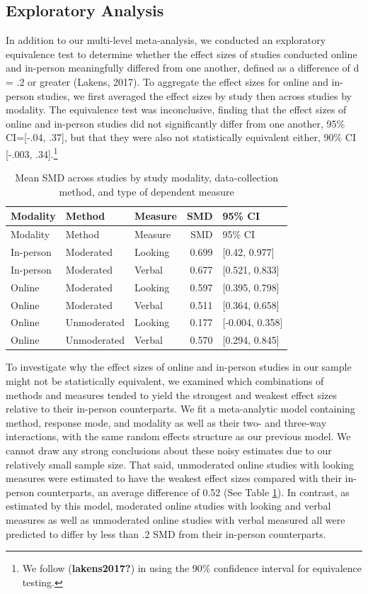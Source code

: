 \documentclass[
  man,floatsintext]{apa6}
\begin{document}
\hypertarget{exploratory-analysis}{%
\subsection{Exploratory Analysis}\label{exploratory-analysis}}

In addition to our multi-level meta-analysis, we conducted an exploratory equivalence test to determine whether the effect sizes of studies conducted online and in-person meaningfully differed from one another, defined as a difference of d = .2 or greater (Lakens, 2017). To aggregate the effect sizes for online and in-person studies, we first averaged the effect sizes by study then across studies by modality. The equivalence test was inconclusive, finding that the effect sizes of online and in-person studies did not significantly differ from one another, 95\% CI={[}-.04, .37{]}, but that they were also not statistically equivalent either, 90\% CI {[}-.003, .34{]}.\footnote{We follow (\textbf{lakens2017?}) in using the 90\% confidence interval for equivalence testing.}

\begin{longtable}[]{@{}lllrl@{}}
\caption{\label{tab:modmeans}Mean SMD across studies by study modality, data-collection method, and type of dependent measure}\tabularnewline
\toprule()
Modality & Method & Measure & SMD & 95\% CI \\
\midrule()
\endfirsthead
\toprule()
Modality & Method & Measure & SMD & 95\% CI \\
\midrule()
\endhead
In-person & Moderated & Looking & 0.699 & {[}0.42, 0.977{]} \\
In-person & Moderated & Verbal & 0.677 & {[}0.521, 0.833{]} \\
Online & Moderated & Looking & 0.597 & {[}0.395, 0.798{]} \\
Online & Moderated & Verbal & 0.511 & {[}0.364, 0.658{]} \\
Online & Unmoderated & Looking & 0.177 & {[}-0.004, 0.358{]} \\
Online & Unmoderated & Verbal & 0.570 & {[}0.294, 0.845{]} \\
\bottomrule()
\end{longtable}

To investigate why the effect sizes of online and in-person studies in our sample might not be statistically equivalent, we examined which combinations of methods and measures tended to yield the strongest and weakest effect sizes relative to their in-person counterparts. We fit a meta-analytic model containing method, response mode, and modality as well as their two- and three-way interactions, with the same random effects structure as our previous model. We cannot draw any strong conclusions about these noisy estimates due to our relatively small sample size. That said, unmoderated online studies with looking measures were estimated to have the weakest effect sizes compared with their in-person counterparts, an average difference of 0.52 (See Table \ref{tab:modmeans}). In contrast, as estimated by this model, moderated online studies with looking and verbal measures as well as unmoderated online studies with verbal measured all were predicted to differ by less than .2 SMD from their in-person counterparts.
\end{document}
